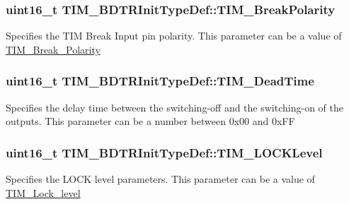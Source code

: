 \subsubsection[{\texorpdfstring{T\+I\+M\+\_\+\+Break\+Polarity}{TIM_BreakPolarity}}]{\setlength{\rightskip}{0pt plus 5cm}uint16\+\_\+t T\+I\+M\+\_\+\+B\+D\+T\+R\+Init\+Type\+Def\+::\+T\+I\+M\+\_\+\+Break\+Polarity}\hypertarget{struct_t_i_m___b_d_t_r_init_type_def_a5731e4e786b66f35cfe4798d6157619e}{}\label{struct_t_i_m___b_d_t_r_init_type_def_a5731e4e786b66f35cfe4798d6157619e}
Specifies the T\+IM Break Input pin polarity. This parameter can be a value of \hyperlink{group___t_i_m___break___polarity}{T\+I\+M\+\_\+\+Break\+\_\+\+Polarity} 
\subsubsection[{\texorpdfstring{T\+I\+M\+\_\+\+Dead\+Time}{TIM_DeadTime}}]{\setlength{\rightskip}{0pt plus 5cm}uint16\+\_\+t T\+I\+M\+\_\+\+B\+D\+T\+R\+Init\+Type\+Def\+::\+T\+I\+M\+\_\+\+Dead\+Time}\hypertarget{struct_t_i_m___b_d_t_r_init_type_def_a01ccbaffccdb3068b8a60c912579b1a2}{}\label{struct_t_i_m___b_d_t_r_init_type_def_a01ccbaffccdb3068b8a60c912579b1a2}
Specifies the delay time between the switching-\/off and the switching-\/on of the outputs. This parameter can be a number between 0x00 and 0x\+FF 
\subsubsection[{\texorpdfstring{T\+I\+M\+\_\+\+L\+O\+C\+K\+Level}{TIM_LOCKLevel}}]{\setlength{\rightskip}{0pt plus 5cm}uint16\+\_\+t T\+I\+M\+\_\+\+B\+D\+T\+R\+Init\+Type\+Def\+::\+T\+I\+M\+\_\+\+L\+O\+C\+K\+Level}\hypertarget{struct_t_i_m___b_d_t_r_init_type_def_aa5296a7b194d25b16899f6a98da01f03}{}\label{struct_t_i_m___b_d_t_r_init_type_def_aa5296a7b194d25b16899f6a98da01f03}
Specifies the L\+O\+CK level parameters. This parameter can be a value of \hyperlink{group___t_i_m___lock__level}{T\+I\+M\+\_\+\+Lock\+\_\+level} 
